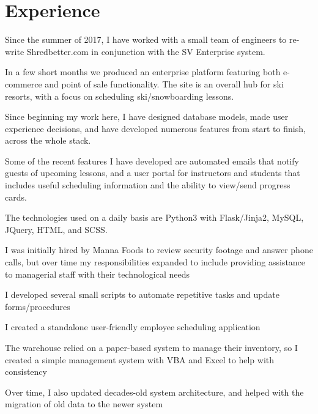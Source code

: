 \documentclass[letterpaper]{deedy-resume} %
\begin{document}
\begin{minipage}[t]{0.64\textwidth} %


\section{Experience}


Since the summer of 2017, I have worked with a small team of engineers to re-write Shredbetter.com in conjunction with the SV Enterprise system.
\sectionspace
\begin{tightitemize}
\item In a few short months we produced an enterprise platform featuring both e-commerce and point of sale functionality. The site is an overall hub for ski resorts, with a focus on scheduling ski/snowboarding lessons.
\item Since beginning my work here, I have designed database models, made user experience decisions, and have developed numerous features from start to finish, across the whole stack. 
\item Some of the recent features I have developed are automated emails that notify guests of upcoming lessons, and a user portal for instructors and students that includes useful scheduling information and the ability to view/send progress cards.
\item The technologies used on a daily basis are Python3 with Flask/Jinja2, MySQL, JQuery, HTML, and SCSS.
\end{tightitemize}

\sectionspace %


I was initially hired by Manna Foods to review security footage and answer phone calls, but over time my responsibilities expanded to include providing assistance to managerial staff with their technological needs
\begin{tightitemize}
\item I developed several small scripts to automate repetitive tasks and update forms/procedures
\item I created a standalone user-friendly employee scheduling application
\item The warehouse relied on a paper-based system to manage their inventory, so I created a simple management system with VBA and Excel to help with consistency
\item Over time, I also updated decades-old system architecture, and helped with the migration of old data to the newer system
\end{tightitemize}


\end{minipage}
\end{document}
